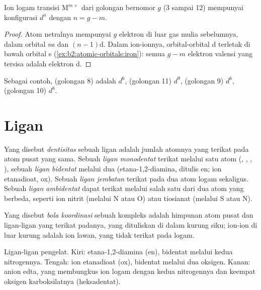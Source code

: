 \begin{proposition}\label{prop:b2:coordination-complexes:dn}
Ion logam transisi $\mathrm M^{m+}$ dari golongan bernomor $g$ (3 sampai 12)
mempunyai konfigurasi $d^n$ dengan $n = g - m$.
\end{proposition}

\begin{proof}
Atom netralnya mempunyai $g$ elektron di luar gas mulia sebelumnya, dalam
orbital $n$s dan $(n - 1)$d. Dalam ion-ionnya, orbital-orbital d terletak di
bawah orbital s (\cref{ex:b2:atomic-orbitals:iron}): semua $g - m$ elektron
valensi yang tersisa adalah elektron d.
\end{proof}

Sebagai contoh,  (golongan 8) adalah $d^6$,  (golongan 11) $d^9$,
 (golongan 9) $d^6$,  (golongan 10) $d^8$.

\section{Ligan}

\begin{definition}[Dentisitas]\label{def:b2:coordination-complexes:denticity}
Yang disebut \emph{dentisitas} sebuah ligan adalah jumlah
atomnya yang terikat pada atom pusat yang sama. Sebuah \emph{ligan
monodentat} terikat melalui satu atom (,
, , ), sebuah \emph{ligan
bidentat} melalui dua (etana-1,2-diamina, ditulis en;
ion etanadioat, ox). Sebuah \emph{ligan jembatan}
terikat pada dua atom logam sekaligus. Sebuah \emph{ligan
ambidentat} dapat terikat melalui salah satu dari
dua atom yang berbeda, seperti ion nitrit (melalui N atau O) atau tiosianat
(melalui S atau N).
\end{definition}

\begin{definition}\label{def:b2:coordination-complexes:coordination-sphere}
Yang disebut \emph{bola koordinasi} sebuah kompleks
adalah himpunan atom pusat dan ligan-ligan yang terikat padanya, yang
dituliskan di dalam kurung siku; ion-ion di luar kurung adalah ion lawan,
yang tidak terikat pada logam.
\end{definition}

\begin{omfigure}
\qquad
{}
\qquad
{}

\medskip
{\small Ligan-ligan pengelat. Kiri: etana-1,2-diamina (en), bidentat melalui
kedua nitrogennya. Tengah: ion etanadioat (ox), bidentat melalui dua
oksigen. Kanan: anion edta, yang membungkus ion logam dengan kedua
nitrogennya dan keempat oksigen karboksilatnya (heksadentat).}
\end{omfigure}

